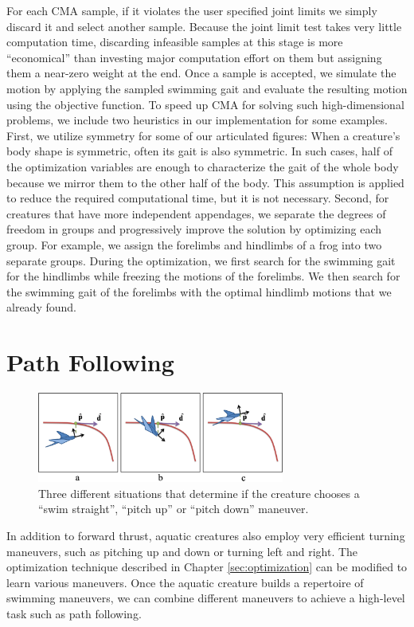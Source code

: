 For each CMA sample, if it violates the user specified joint limits we
simply discard it and select another sample. Because the joint limit test
takes very little computation time, discarding infeasible samples at this
stage is more ``economical'' than investing major computation effort
on them but assigning them a near-zero weight at the end. Once a sample is
accepted, we simulate the motion by applying the sampled swimming gait and
evaluate the resulting motion using the objective function. To speed up
CMA for solving such high-dimensional problems, we include two heuristics
in our implementation for some examples. First, we utilize symmetry for
some of our articulated figures: When a creature's body shape is symmetric, often its gait is also symmetric. In such cases, half of the optimization variables are enough to characterize the gait of the whole body because we mirror them to the other half of the body. This assumption is applied to reduce the required computational time, but it is not necessary.
Second, for creatures that have more
independent appendages, we separate the degrees of freedom in groups and
progressively improve the solution by optimizing each group. For example,
we assign the forelimbs and hindlimbs of a frog into two separate groups.
During the optimization, we first search for the swimming gait for the
hindlimbs while freezing the motions of the forelimbs. We then search for
the swimming gait of the forelimbs with the optimal hindlimb motions that we
already found.

\section{Path Following}

\begin{figure}[!b]
\centering
\includegraphics[width=3.2in]{figures/pathCase.eps}
\caption{Three different situations that determine if the creature chooses a ``swim straight'', ``pitch up'' or ``pitch down'' maneuver.}
\label{fig:pathCases}
\end{figure}

In addition to forward thrust, aquatic creatures also employ very
efficient turning maneuvers, such as pitching up and down or turning left
and right. The optimization technique described in Chapter
\ref{sec:optimization} can be modified to learn various
maneuvers. Once the aquatic creature builds a repertoire of swimming
maneuvers, we can combine different maneuvers to achieve a high-level
task such as path following.


